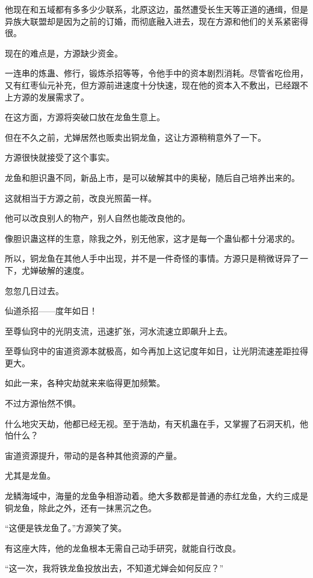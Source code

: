\begin{this_body}
他现在和五域都有多多少少联系，北原这边，虽然遭受长生天等正道的通缉，但是异族大联盟却是因为之前的订婚，而彻底融入进去，现在方源和他们的关系紧密得很。

现在的难点是，方源缺少资金。

一连串的炼蛊、修行，锻炼杀招等等，令他手中的资本剧烈消耗。尽管省吃俭用，又有红枣仙元补充，但方源前进速度十分快速，现在他的资本入不敷出，已经跟不上方源的发展需求了。

在这方面，方源将突破口放在龙鱼生意上。

但在不久之前，尤婵居然也贩卖出铜龙鱼，这让方源稍稍意外了一下。

方源很快就接受了这个事实。

龙鱼和胆识蛊不同，新品上市，是可以破解其中的奥秘，随后自己培养出来的。

这就相当于方源之前，改良光照菌一样。

他可以改良别人的物产，别人自然也能改良他的。

像胆识蛊这样的生意，除我之外，别无他家，这才是每一个蛊仙都十分渴求的。

所以，铜龙鱼在其他人手中出现，并不是一件奇怪的事情。方源只是稍微讶异了一下，尤婵破解的速度。

忽忽几日过去。

仙道杀招——度年如日！

至尊仙窍中的光阴支流，迅速扩张，河水流速立即飙升上去。

至尊仙窍中的宙道资源本就极高，如今再加上这记度年如日，让光阴流速差距拉得更大。

如此一来，各种灾劫就来来临得更加频繁。

不过方源怡然不惧。

什么地灾天劫，他都已经无视。至于浩劫，有天机蛊在手，又掌握了石洞天机，他怕什么？

宙道资源提升，带动的是各种其他资源的产量。

尤其是龙鱼。

龙鳞海域中，海量的龙鱼争相游动着。绝大多数都是普通的赤红龙鱼，大约三成是铜龙鱼，除此之外，还有一抹黑沉之色。

“这便是铁龙鱼了。”方源笑了笑。

有这座大阵，他的龙鱼根本无需自己动手研究，就能自行改良。

“这一次，我将铁龙鱼投放出去，不知道尤婵会如何反应？”

\end{this_body}

